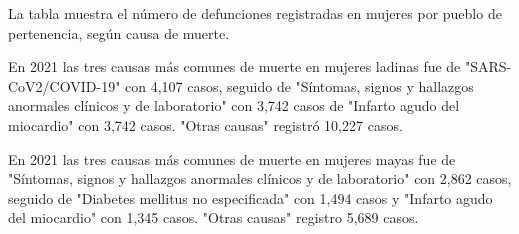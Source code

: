 \justifying La tabla muestra el número de defunciones registradas en mujeres por pueblo de pertenencia, según causa de muerte. 

En 2021 las tres causas más comunes de muerte en mujeres ladinas fue de "SARS-CoV2/COVID-19" con 4,107 casos, seguido de 	"Síntomas, signos y hallazgos anormales clínicos y de laboratorio" con 3,742 casos de "Infarto agudo del miocardio" con 3,742 casos. "Otras causas" registró 10,227 casos. 

En 2021 las tres causas más comunes de muerte en mujeres mayas fue de "Síntomas, signos y hallazgos anormales clínicos y de laboratorio" con 2,862 casos, seguido de "Diabetes mellitus no especificada" con 1,494 casos y "Infarto agudo del miocardio" con 1,345 casos. "Otras causas" registro 5,689 casos.